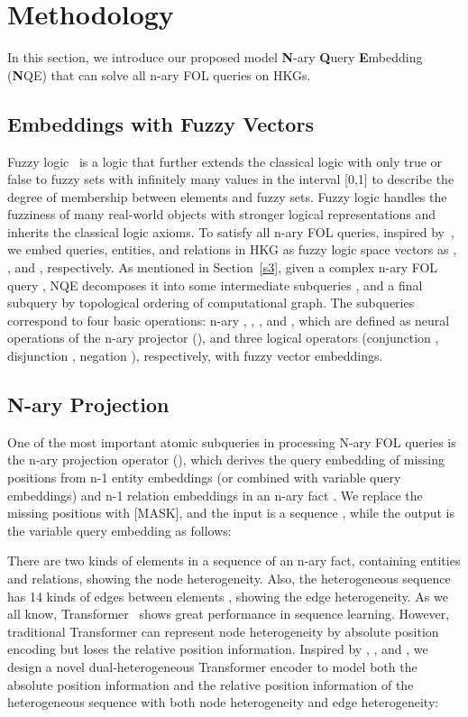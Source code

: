 \documentclass[letterpaper]{article} \usepackage{aaai23}  \usepackage{times}  \usepackage{helvet}  \usepackage{courier}  \usepackage[hyphens]{url}  \usepackage{graphicx} \urlstyle{rm} \def\UrlFont{\rm}  \usepackage{natbib}  \usepackage{caption} \frenchspacing  \setlength{\pdfpagewidth}{8.5in}  \setlength{\pdfpageheight}{11in}  \usepackage{algorithm}
\begin{document}
\section{Methodology}
In this section, we introduce our proposed model \textbf{N}-ary \textbf{Q}uery \textbf{E}mbedding (\textbf{N}QE) that can solve all n-ary FOL queries on HKGs.
\subsection{Embeddings with Fuzzy Vectors}
Fuzzy logic~\citep{logic1} is a logic that further extends the classical logic with only true or false to fuzzy sets with infinitely many values in the interval [0,1] to describe the degree of membership between elements and fuzzy sets. Fuzzy logic handles the fuzziness of many real-world objects with stronger logical representations and inherits the classical logic axioms. To satisfy all n-ary FOL queries, inspired by~\citep{FuzzQE}, we embed queries, entities, and relations in HKG as fuzzy logic space vectors  as , , and , respectively. As mentioned in Section~\ref{s3}, given a complex n-ary FOL query , 
NQE decomposes it into some intermediate subqueries , and a final subquery  by topological ordering of computational graph. The subqueries correspond to four basic operations: n-ary , , , and , which are defined as neural operations of the n-ary projector (), and three logical operators (conjunction , disjunction , negation ), respectively, with fuzzy vector embeddings.

\subsection{N-ary Projection}

One of the most important atomic subqueries in processing N-ary FOL queries is the n-ary projection operator (), which derives the query embedding of missing positions from n-1 entity embeddings (or combined with variable query embeddings) and n-1 relation embeddings in an n-ary fact . We replace the missing positions with [MASK], and the input is a sequence , while the output is the variable query embedding  as follows:


There are two kinds of elements in a sequence of an n-ary fact, containing entities and relations, showing the node heterogeneity. Also, the heterogeneous sequence has 14 kinds of edges between elements , showing the edge heterogeneity. As we all know, Transformer~\citep{Transformer} shows great performance in sequence learning. However, traditional Transformer can represent node heterogeneity by absolute position encoding but loses the relative position information. Inspired by \citep{HAN}, \citep{RPRT}, and \citep{GRAN}, we design a novel dual-heterogeneous Transformer encoder to model both the absolute position information and the relative position information of the heterogeneous sequence with both node heterogeneity and edge heterogeneity:
\end{document}
